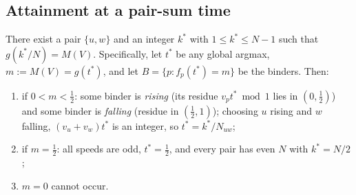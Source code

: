 \subsection{Attainment at a pair-sum time}

\begin{lemma}[attainment]\label{lem:attainment}
There exist a pair $\{u,w\}$ and an integer $k^\ast$ with
$1\le k^\ast\le N-1$ such that $g(k^\ast/N)=M(V)$. Specifically, let
$t^\ast$ be any global argmax, $m:=M(V)=g(t^\ast)$, and let
$B=\{p: f_p(t^\ast)=m\}$ be the binders. Then:
\begin{enumerate}[leftmargin=1.8em,itemsep=1pt]
\item[(a)] if $0<m<\tfrac12$: some binder is \emph{rising} (its residue
  $v_p t^\ast\bmod 1$ lies in $(0,\tfrac12)$) and some binder is
  \emph{falling} (residue in $(\tfrac12,1)$); choosing $u$ rising and $w$
  falling, $(v_u+v_w)t^\ast$ is an integer, so
  $t^\ast=k^\ast/N_{uw}$;
\item[(b)] if $m=\tfrac12$: all speeds are odd, $t^\ast=\tfrac12$, and
  every pair has even $N$ with $k^\ast=N/2$;
\item[(c)] $m=0$ cannot occur.
\end{enumerate}
\end{lemma}

